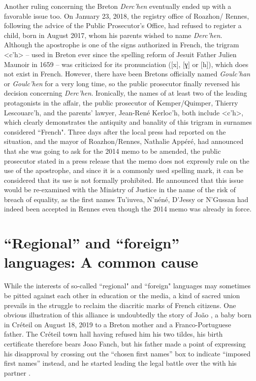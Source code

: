 \documentclass[output=paper,colorlinks,citecolor=brown]{langscibook}
\begin{document}
Another ruling concerning the Breton  \textit{Derc’hen} eventually ended up with a favorable issue too. On January 23, 2018, the registry office of Roazhon/ Rennes, following the advice of the Public Prosecutor's Office, had refused to register a child, born in August 2017, whom his parents wished to name \textit{Derc'hen}. Although the apostrophe is one of the signs authorized in French, the trigram <c'h> – used in Breton ever since the spelling reform of Jesuit Father Julien Maunoir in 1659 – was criticized for its pronunciation ([x], [ɣ] or [h]), which does not exist in French. However, there have been Bretons officially named \textit{Goulc'han} or \textit{Goulc'hen} for a very long time, so the public prosecutor finally reversed his decision concerning \textit{Derc'hen}. Ironically, the names of at least two of the leading protagonists in the  affair, the public prosecutor of Kemper/Quimper, Thierry Lescouarc'h, and the parents' lawyer, Jean-René Kerloc'h, both include <c'h>, which clearly demonstrates the antiquity and banality of this trigram in surnames considered ``French". Three days after the local press had reported on the situation, and the mayor of Roazhon/Rennes, Nathalie Appéré, had announced that she was going to ask for the 2014 memo to be amended, the public prosecutor stated in a press release that the memo does not expressly rule on the use of the apostrophe, and since it is a commonly used spelling mark, it can be considered that its use is not formally prohibited. He announced that this issue would be re-examined with the Ministry of Justice in the name of the risk of breach of equality, as the first names Tu'iuvea, N'néné, D'Jessy or N'Gussan had indeed been accepted in Rennes even though the 2014 memo was already in force. 

\section{``Regional” and ``foreign” languages: {A} common cause}

While the interests of so-called ``regional" and ``foreign" languages may sometimes be pitted against each other in education or the media, a kind of sacred union prevails in the struggle to reclaim the diacritic marks of French citizens. One obvious illustration of this alliance is undoubtedly the story of João , a baby born in Créteil on August 18, 2019 to a Breton mother and a Franco-Portuguese father. The Créteil town hall having refused him his two tildes, his birth certificate therefore bears Joao Fanch, but his father made a point of expressing his disapproval by crossing out the “chosen first names” box to indicate “imposed first names” instead, and he started leading the legal battle over the  with his partner \citep{sm:Delporte2019}. 
\end{document}
